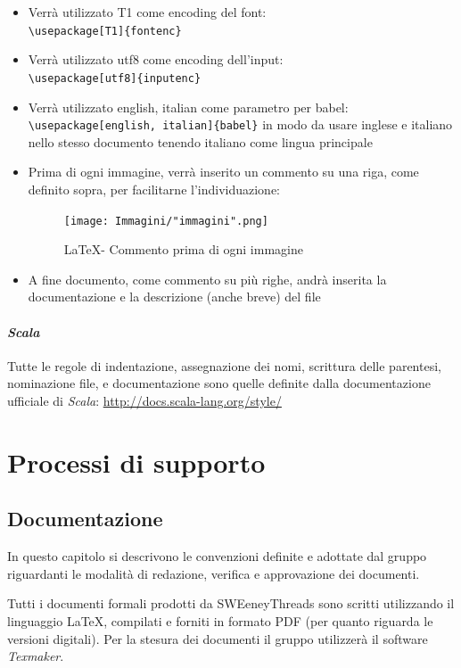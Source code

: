 \documentclass[a4paper]{report}
\newcommand{\mychapter}[2]{
	\setcounter{chapter}{#1}
	\setcounter{section}{0}
	\setcounter{subsection}{1}
	\chapter*{#2}
	\addcontentsline{toc}{chapter}{#2}
}
\begin{document}
\begin{itemize}
		verranno comunque indentate le parti innestate al loro interno come segue:
		\begin{figure}[H]
			\centering
			\texttt{[image: Immagini/"indent2".png]}
			\caption{\LaTeX \space - Indentazione 2}
		\end{figure}
		\item Verrà utilizzato T1 come encoding del font: \\ \verb|\usepackage[T1]{fontenc}|
		\item Verrà utilizzato utf8 come encoding dell'input: \\ \verb|\usepackage[utf8]{inputenc}|
		\item Verrà utilizzato english, italian come parametro per babel: \\ 
		\verb|\usepackage[english, italian]{babel}| in modo da usare inglese e italiano nello 
		stesso documento tenendo italiano come lingua principale
		\item Prima di ogni immagine, verrà inserito un commento su una riga, come definito 
		sopra, per facilitarne l'individuazione:
		\begin{figure}[H]
			\centering
			\texttt{[image: Immagini/"immagini".png]}
			\caption{\LaTeX \space - Commento prima di ogni immagine}
		\end{figure}
		\item A fine documento, come commento su più righe, andrà inserita la documentazione e la descrizione (anche breve) del file
	\end{itemize}
	\subsubsection{\emph{Scala}}
	Tutte le regole di indentazione, assegnazione dei nomi, scrittura delle parentesi, nominazione file, e documentazione sono quelle
	definite dalla documentazione ufficiale di \emph{Scala}: \url{http://docs.scala-lang.org/style/}
	\mychapter{3}{Processi di supporto}
	\section{Documentazione} 
	In questo capitolo si descrivono le convenzioni definite e adottate dal gruppo riguardanti le 
	modalità di redazione, verifica e approvazione dei documenti.
	
	Tutti i documenti formali prodotti da SWEeneyThreads sono scritti utilizzando il linguaggio \LaTeX, 
	compilati e forniti in formato PDF (per quanto riguarda le versioni digitali). Per la stesura dei 
	documenti il gruppo utilizzerà il software \emph{Texmaker}.
\end{document}
